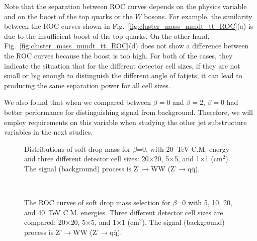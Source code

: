\documentclass[12pt,twoside,a4paper,an,final]{cms-tdr}
\begin{document}
Note that the separation between ROC curves depends 
on the physics variable and on the boost of the top quarks or the $W$ bosons. For example, 
the similarity between the ROC curves shown in Fig.~\ref{fig:cluster_mass_mmdt_tt_ROC}(a)
is due to the insufficient boost of the top quarks.
On the other hand, Fig.~\ref{fig:cluster_mass_mmdt_tt_ROC}(d) does not show a difference 
between the ROC curves because the boost is too high.
For both of the cases, they indicate the situation that for the different detector cell sizes, if they are not small or big enough to distinguish the different angle of fatjets, it can lead to producing the same separation power for all cell sizes.

We also found that when we compared between $\beta=0$ and $\beta=2$, $\beta=0$ had better performance for distinguishing signal from background. Therefore, we will 
employ requirements on this variable when studying the other jet substructure variables in the next studies. 
 
\begin{figure}
\begin{center}
\end{center}
\caption{Distributions of soft drop mass for $\beta$=0, with 20~TeV C.M. energy and three different detector cell sizes: 20$\times$20, 
5$\times$5, and 1$\times$1 ($\mathrm{cm}^{2}$). The signal (background) process is 
Z'$\rightarrow$WW (Z'$\rightarrow$q$\bar{\mathrm{q}}$).
\label{fig:cluster_mass_mmdt_ww}}
\end{figure}


\begin{figure}
\begin{center}
  \\
\end{center}
\caption{The ROC curves of soft drop mass selection for $\beta$=0 
with 5, 10, 20, and 40~TeV C.M. energies. 
Three different detector cell sizes are compared: 20$\times$20, 
5$\times$5, and 1$\times$1 ($\mathrm{cm}^{2}$). 
The signal (background) process is Z'$\rightarrow$WW 
(Z'$\rightarrow$q$\bar{\mathrm{q}}$).}
\label{fig:cluster_mass_mmdt_ww_ROC}
\end{figure}
\end{document}
